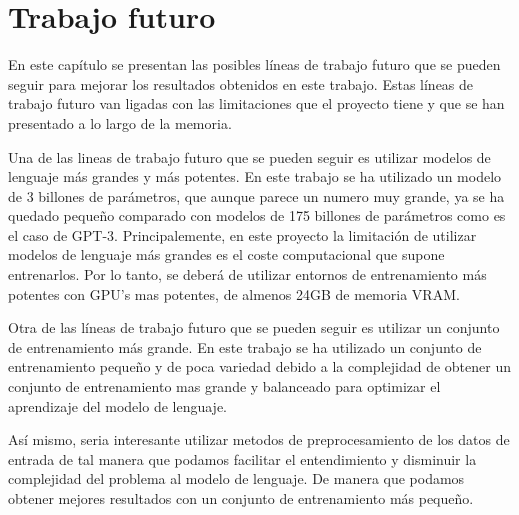 \chapter{Trabajo futuro}
\label{cap:trabajo_futuro}

En este capítulo se presentan las posibles líneas de trabajo futuro que se pueden seguir
para mejorar los resultados obtenidos en este trabajo. Estas líneas de trabajo futuro
van ligadas con las limitaciones que el proyecto tiene y que se han presentado a lo largo
de la memoria.

Una de las lineas de trabajo futuro que se pueden seguir es utilizar modelos de lenguaje
más grandes y más potentes. En este trabajo se ha utilizado un modelo de 3 billones de parámetros,
que aunque parece un numero muy grande, ya se ha quedado pequeño comparado con modelos de
175 billones de parámetros como es el caso de GPT-3. Principalemente, en este proyecto la
limitación de utilizar modelos de lenguaje más grandes es el coste computacional que supone
entrenarlos. Por lo tanto, se deberá de utilizar entornos de entrenamiento más potentes
con GPU's mas potentes, de almenos 24GB de memoria VRAM.

Otra de las líneas de trabajo futuro que se pueden seguir es utilizar un conjunto de entrenamiento
más grande. En este trabajo se ha utilizado un conjunto de entrenamiento pequeño y de poca variedad
debido a la complejidad de obtener un conjunto de entrenamiento mas grande y balanceado para optimizar
el aprendizaje del modelo de lenguaje.

Así mismo, seria interesante utilizar metodos de preprocesamiento de los datos de entrada de tal manera
que podamos facilitar el entendimiento y disminuir la complejidad del problema al modelo de lenguaje.
De manera que podamos obtener mejores resultados con un conjunto de entrenamiento más pequeño.